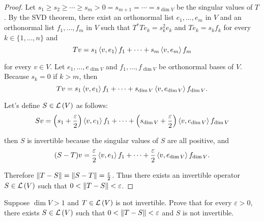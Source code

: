 \begin{proof}
    Let $s_{1}\geq s_{2}\geq \cdots \geq s_{m} > 0 = s_{m+1} = \cdots = s_{\dim V}$ be the singular values of $T$. By the SVD theorem, there exist an orthonormal list $e_{1}, \ldots, e_{m}$ in $V$ and an orthonormal list $f_{1}, \ldots, f_{m}$ in $V$ such that $T^{*}Te_{k} = s_{k}^{2}e_{k}$ and $Te_{k} = s_{k}f_{k}$ for every $k\in\{ 1,\ldots,n \}$ and
    \[
        Tv = s_{1}\left\langle{v,e_{1}}\right\rangle f_{1} + \cdots + s_{m}\left\langle{v,e_{m}}\right\rangle f_{m}
    \]

    for every $v\in V$. Let $e_{1}, \ldots, e_{\dim V}$ and $f_{1}, \ldots, f_{\dim V}$ be orthonormal bases of $V$. Because $s_{k} = 0$ if $k > m$, then
    \[
        Tv = s_{1}\left\langle{v,e_{1}}\right\rangle f_{1} + \cdots + s_{\dim V}\left\langle{v, e_{\dim V}}\right\rangle f_{\dim V}.
    \]

    Let's define $S\in\mathcal{L}\left({V}\right)$ as follows:
    \[
        Sv = \left(s_{1} + \frac{\varepsilon}{2}\right)\left\langle{v,e_{1}}\right\rangle f_{1} + \cdots + \left(s_{\dim V} + \frac{\varepsilon}{2}\right)\left\langle{v, e_{\dim V}}\right\rangle f_{\dim V}
    \]

    then $S$ is invertible because the singular values of $S$ are all positive, and
    \[
        (S - T)v = \frac{\varepsilon}{2}\left\langle{v,e_{1}}\right\rangle f_{1} + \cdots + \frac{\varepsilon}{2}\left\langle{v,e_{\dim V}}\right\rangle f_{\dim V}.
    \]

    Therefore $\left\Vert{T - S}\right\Vert = \left\Vert{S - T}\right\Vert = \frac{\varepsilon}{2}$. Thus there exists an invertible operator $S\in\mathcal{L}\left({V}\right)$ such that $0 < \left\Vert{T - S}\right\Vert < \varepsilon$.
\end{proof}
\newpage

\begin{exercise}
    Suppose $\dim V > 1$ and $T\in\mathcal{L}\left({V}\right)$ is not invertible. Prove that for every $\varepsilon > 0$, there exists $S\in\mathcal{L}\left({V}\right)$ such that $0 < \left\Vert{T - S}\right\Vert < \varepsilon$ and $S$ is not invertible.
\end{exercise}

